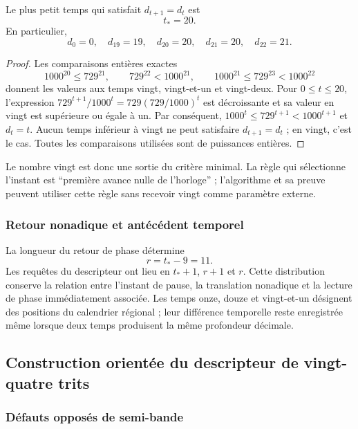 \begin{proposition}
Le plus petit temps qui satisfait $d_{t+1}=d_t$ est
\[
 t_*=20.
\]
En particulier,
\[
 d_0=0,\quad d_{19}=19,\quad d_{20}=20,
 \quad d_{21}=20,\quad d_{22}=21.
\]
\end{proposition}
\begin{proof}
Les comparaisons entières exactes
\[
 1000^{20}\leq729^{21},\qquad
 729^{22}<1000^{21},\qquad
 1000^{21}\leq729^{23}<1000^{22}
\]
donnent les valeurs aux temps vingt, vingt-et-un et vingt-deux. Pour
$0\leq t\leq20$, l'expression
$729^{t+1}/1000^t=729(729/1000)^t$ est décroissante et sa valeur en vingt
est supérieure ou égale à un. Par conséquent,
$1000^t\leq729^{t+1}<1000^{t+1}$ et $d_t=t$. Aucun temps inférieur à
vingt ne peut satisfaire $d_{t+1}=d_t$ ; en vingt, c'est le cas.
Toutes les comparaisons utilisées sont de puissances entières.
\end{proof}

Le nombre vingt est donc une sortie du critère minimal. La règle qui sélectionne l'instant est ``première avance nulle de l'horloge'' ; l'algorithme et sa preuve peuvent utiliser cette règle sans recevoir vingt comme paramètre externe.

\subsubsection{Retour nonadique et antécédent temporel}

La longueur du retour de phase détermine
\begin{equation}
 r=t_*-9=11.
 \label{eq:kdes-retorno}
\end{equation}
Les requêtes du descripteur ont lieu en $t_*+1$, $r+1$ et $r$.
Cette distribution conserve la relation entre l'instant de pause, la
translation nonadique et la lecture de phase immédiatement associée. Les
temps onze, douze et vingt-et-un désignent des positions du calendrier
régional ; leur différence temporelle reste enregistrée même lorsque deux
temps produisent la même profondeur décimale.

\subsection{Construction orientée du descripteur de vingt-quatre trits}

\subsubsection{Défauts opposés de semi-bande}

